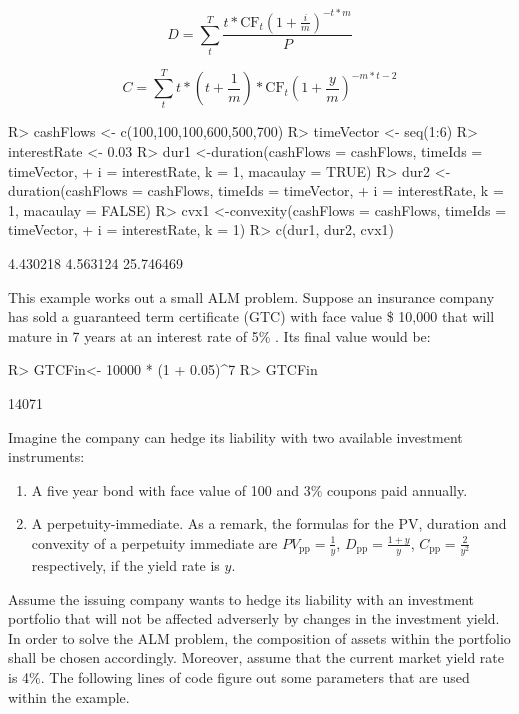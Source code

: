 \documentclass[nojss]{jss}
\begin{document}
\begin{equation}
D = \sum\limits_t^{T} \frac{t*\text{CF}_{t} \left( 1 + \frac{i}{m} \right)^{
- t * m}}{P}
\label{eq:duration}
\end{equation}


\begin{equation}
C = \sum\limits_{t}^{T} t * \left( t +
\frac{1}{m} \right) * \text{CF}_{t} \left( 1 + \frac{y}{m} \right)^{ - m * t - 2}
\label{eq:convexity}
\end{equation}

\begin{Schunk}
\begin{Sinput}
R> cashFlows <- c(100,100,100,600,500,700)
R> timeVector <- seq(1:6)
R> interestRate <- 0.03
R> dur1 <-duration(cashFlows = cashFlows, timeIds = timeVector, 
+  		i = interestRate, k = 1, macaulay = TRUE)
R> dur2 <-duration(cashFlows = cashFlows, timeIds = timeVector, 
+  		i = interestRate, k = 1, macaulay = FALSE)
R> cvx1 <-convexity(cashFlows = cashFlows, timeIds = timeVector, 
+  		i = interestRate, k = 1)
R> c(dur1, dur2, cvx1)
\end{Sinput}
\begin{Soutput}
[1]  4.430218  4.563124 25.746469
\end{Soutput}
\end{Schunk}

This example works out a small ALM problem. Suppose an insurance company has
sold a guaranteed term certificate (GTC) with face value \$ 10,000 that will
mature in 7 years at an interest rate of 5\% . Its final value would be:

\begin{Schunk}
\begin{Sinput}
R> GTCFin<- 10000 * (1 + 0.05)^7
R> GTCFin
\end{Sinput}
\begin{Soutput}
[1] 14071
\end{Soutput}
\end{Schunk}

Imagine the company can hedge its liability with two available investment
instruments:
\begin{enumerate}
  \item A five year bond with face value of 100 and 3\% coupons paid annually.
  \item A perpetuity-immediate. As a remark, the formulas for the PV,
  duration and convexity of a perpetuity immediate are $PV_{\text{pp}}=\frac{1}{y}$, 
  $D_{\text{pp}}=\frac{1+y}{y}$, $C_{\text{pp}}=\frac{2}{y^2}$ respectively, if the yield rate is $y$.
 \end{enumerate}
Assume the issuing company wants to hedge its liability with an investment
portfolio that will not be affected adverserly by changes in the investment yield. In order to solve
the ALM problem, the composition of assets within the portfolio shall be
chosen accordingly. Moreover, assume that the current market yield rate is 4\%. The following lines of code figure out some parameters that are used within the
example.
\end{document}
